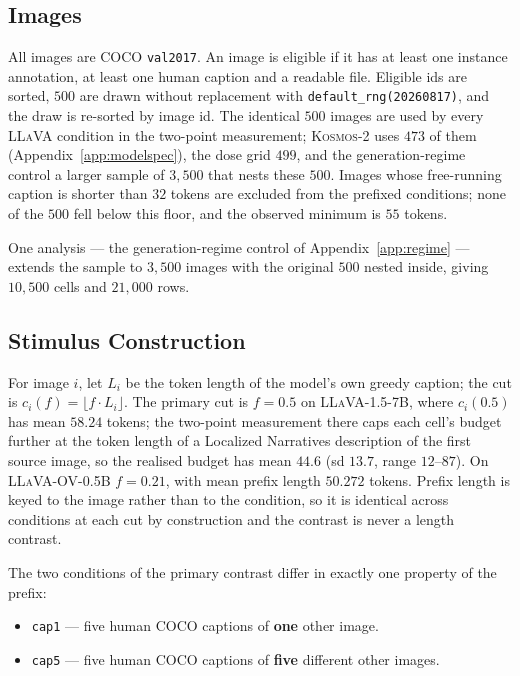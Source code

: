 \subsection{Images}
\label{app:images}

All images are COCO \texttt{val2017}. An image is eligible if it has at least one instance
annotation, at least one human caption and a readable file. Eligible ids are sorted, $500$ are drawn
without replacement with \texttt{default\_rng(20260817)}, and the draw is re-sorted by image id. The
identical $500$ images are used by every \textsc{LLaVA} condition in the two-point measurement;
\textsc{Kosmos-2} uses $473$ of them (Appendix~\ref{app:modelspec}), the dose grid $499$, and the
generation-regime control a larger sample of $3{,}500$ that nests these $500$. Images whose free-running caption
is shorter than $32$ tokens are excluded from the prefixed conditions; none of the $500$ fell below
this floor, and the observed minimum is $55$ tokens.

One analysis --- the generation-regime control of Appendix~\ref{app:regime} --- extends the sample to
$3{,}500$ images with the original $500$ nested inside, giving $10{,}500$ cells and $21{,}000$ rows.

\subsection{Stimulus Construction}
\label{app:stimulus}

For image $i$, let $L_i$ be the token length of the model's own greedy caption; the cut is
$c_i(f) = \lfloor f \cdot L_i \rfloor$. The primary cut is $f = 0.5$ on \textsc{LLaVA-1.5-7B}, where $c_i(0.5)$ has mean $58.24$ tokens;
the two-point measurement there caps each cell's budget further at the token length of a Localized
Narratives description of the first source image, so the realised budget has mean $44.6$ (sd $13.7$,
range $12$--$87$). On \textsc{LLaVA-OV-0.5B} $f = 0.21$, with mean prefix length $50.272$ tokens. Prefix length is keyed to the image rather than to the condition, so it is identical across
conditions at each cut by construction and the contrast is never a length contrast.

The two conditions of the primary contrast differ in exactly one property of the prefix:

\begin{itemize}
\itemsep0em
\item \texttt{cap1} --- five human COCO captions of \textbf{one} other image.
\item \texttt{cap5} --- five human COCO captions of \textbf{five} different other images.
\end{itemize}

